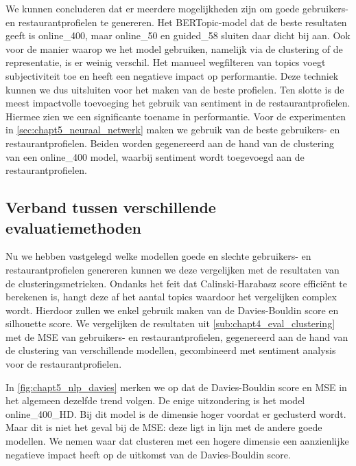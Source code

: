 We kunnen concluderen dat er meerdere mogelijkheden zijn om goede gebruikers- en restaurantprofielen te genereren. Het BERTopic-model dat de beste resultaten geeft is online\_400, maar online\_50 en guided\_58 sluiten daar dicht bij aan. Ook voor de manier waarop we het model gebruiken, namelijk via de clustering of de representatie, is er weinig verschil. Het manueel wegfilteren van topics voegt subjectiviteit toe en heeft een negatieve impact op performantie. Deze techniek kunnen we dus uitsluiten voor het maken van de beste profielen. Ten slotte is de meest impactvolle toevoeging het gebruik van sentiment in de restaurantprofielen. Hiermee zien we een significante toename in performantie.\newline
Voor de experimenten in \autoref{sec:chapt5_neuraal_netwerk} maken we gebruik van de beste gebruikers- en restaurantprofielen. Beiden worden gegenereerd aan de hand van de clustering van een online\_400 model, waarbij sentiment wordt toegevoegd aan de restaurantprofielen.

\subsection{Verband tussen verschillende evaluatiemethoden}
\label{sub:chapt5_compare_eval_methods}
Nu we hebben vastgelegd welke modellen goede en slechte gebruikers- en restaurantprofielen genereren kunnen we deze vergelijken met de resultaten van de clusteringsmetrieken. Ondanks het feit dat Calinski-Harabasz score efficiënt te berekenen is, hangt deze af het aantal topics waardoor het vergelijken complex wordt. Hierdoor zullen we enkel gebruik maken van de Davies-Bouldin score en silhouette score. We vergelijken de resultaten uit \autoref{sub:chapt4_eval_clustering} met de MSE van gebruikers- en restaurantprofielen, gegenereerd aan de hand van de clustering van verschillende modellen, gecombineerd met sentiment analysis voor de restaurantprofielen.


In \autoref{fig:chapt5_nlp_davies} merken we op dat de Davies-Bouldin score en MSE in het algemeen dezelfde trend volgen. De enige uitzondering is het model online\_400\_HD. Bij dit model is de dimensie hoger voordat er geclusterd wordt. Maar dit is niet het geval bij de MSE: deze ligt in lijn met de andere goede modellen. We nemen waar dat clusteren met een hogere dimensie een aanzienlijke negatieve impact heeft op de uitkomst van de Davies-Bouldin score. 


